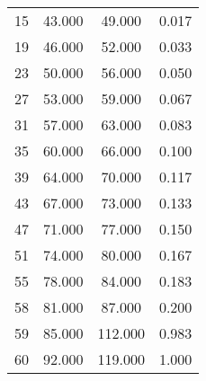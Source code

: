 % 
\begin{tabular}{cccc}
  \hline
  \hline
15 & 43.000 & 49.000 & 0.017 \\ 
  19 & 46.000 & 52.000 & 0.033 \\ 
  23 & 50.000 & 56.000 & 0.050 \\ 
  27 & 53.000 & 59.000 & 0.067 \\ 
  31 & 57.000 & 63.000 & 0.083 \\ 
  35 & 60.000 & 66.000 & 0.100 \\ 
  39 & 64.000 & 70.000 & 0.117 \\ 
  43 & 67.000 & 73.000 & 0.133 \\ 
  47 & 71.000 & 77.000 & 0.150 \\ 
  51 & 74.000 & 80.000 & 0.167 \\ 
  55 & 78.000 & 84.000 & 0.183 \\ 
  58 & 81.000 & 87.000 & 0.200 \\ 
  59 & 85.000 & 112.000 & 0.983 \\ 
  60 & 92.000 & 119.000 & 1.000 \\ 
   \hline
\end{tabular}
